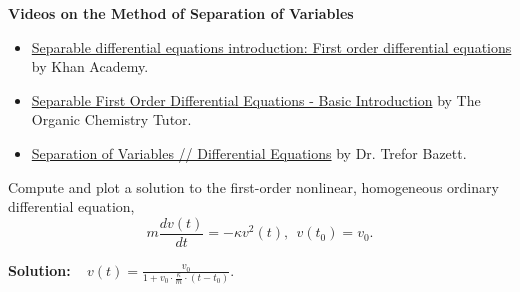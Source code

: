 \bigskip
\textbf{Videos on the Method of Separation of Variables}
\begin{itemize}
    \item \href{https://youtu.be/DL-ozRGDlkY}{Separable differential equations introduction: First order differential equations} by Khan Academy.

    \item \href{https://youtu.be/C7nuJcJriWM}{Separable First Order Differential Equations - Basic Introduction} by The Organic Chemistry Tutor.

    \item \href{https://youtu.be/7Y-frhf-1Zk}{Separation of Variables // Differential Equations} by Dr. Trefor Bazett.

\end{itemize}

\bigskip

\begin{example} 
\label{eq:ChuteODE02}
Compute and plot a solution to the first-order nonlinear, homogeneous ordinary differential equation,  
\begin{equation}
\label{eq:1stOrderNonlinearHomogeneous}
    m \frac{dv(t)}{dt} =  - \kappa v^2(t),~~v(t_0) = v_0.
\end{equation}
   
\end{example}
\textbf{Solution:} \Ans~ $v(t) = \frac{v_0}{1 + v_0 \cdot \frac{\kappa}{m} \cdot \left( t - t_0 \right)}$.\\

